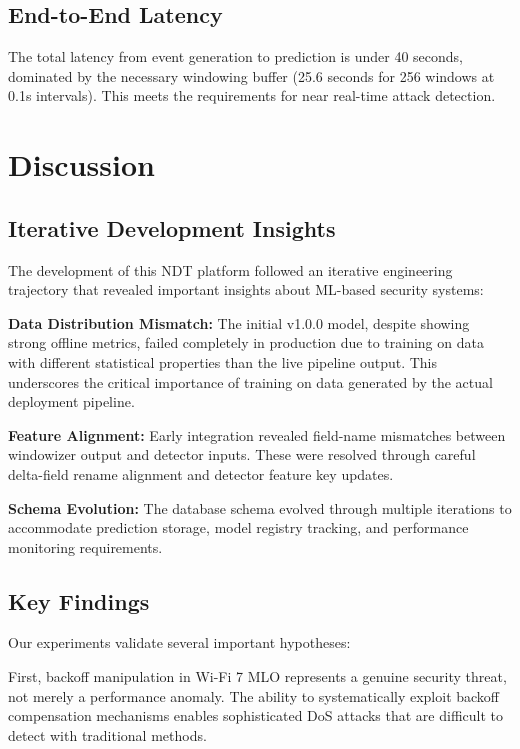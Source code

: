 \documentclass[conference]{IEEEtran}
\begin{document}
\subsection{End-to-End Latency}

The total latency from event generation to prediction is under 40 seconds, dominated by the necessary windowing buffer (25.6 seconds for 256 windows at 0.1s intervals). This meets the requirements for near real-time attack detection.

\section{Discussion}
\label{sec:discussion}

\subsection{Iterative Development Insights}

The development of this NDT platform followed an iterative engineering trajectory that revealed important insights about ML-based security systems:

\textbf{Data Distribution Mismatch:} The initial v1.0.0 model, despite showing strong offline metrics, failed completely in production due to training on data with different statistical properties than the live pipeline output. This underscores the critical importance of training on data generated by the actual deployment pipeline.

\textbf{Feature Alignment:} Early integration revealed field-name mismatches between windowizer output and detector inputs. These were resolved through careful delta-field rename alignment and detector feature key updates.

\textbf{Schema Evolution:} The database schema evolved through multiple iterations to accommodate prediction storage, model registry tracking, and performance monitoring requirements.

\subsection{Key Findings}

Our experiments validate several important hypotheses:

First, backoff manipulation in Wi-Fi 7 MLO represents a genuine security threat, not merely a performance anomaly. The ability to systematically exploit backoff compensation mechanisms enables sophisticated DoS attacks that are difficult to detect with traditional methods.
\end{document}
